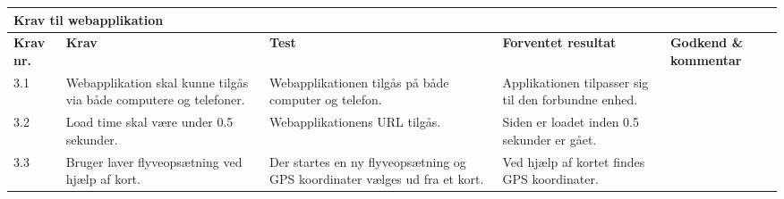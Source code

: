     \centering
    \begin{tabular}{|p{}|p{3.2 cm}|p{3.2 cm}|p{3.2 cm}|p{2.2 cm}|}
			\hline
			\multicolumn{5}{|l|}{\textbf{{\large Krav til webapplikation}}}\\ \hline
			\textbf{Krav nr.} & \textbf{Krav} & \textbf{Test} & \textbf{Forventet \newline resultat} & 			
			\textbf{Godkend \& \newline kommentar} \\ \hline
			
			3.1 & Webapplikation skal kunne tilgås via både computere og telefoner.
				& Webapplikationen tilgås på både computer og telefon.
				& Applikationen tilpasser sig til den forbundne enhed.
				& \\ \hline

			3.2 & Load time skal være under 0.5 sekunder. 
				& Webapplikationens URL tilgås.
				& Siden er loadet inden 0.5 sekunder er gået.
				&  \\ \hline
			
			3.3 & Bruger laver flyveopsætning ved hjælp af kort.
				& Der startes en ny flyveopsætning og GPS koordinater vælges ud fra et kort.
				& Ved hjælp af kortet findes GPS koordinater.
				& \\ \hline				
		\end{tabular}
	\label{tab:krav_1}



